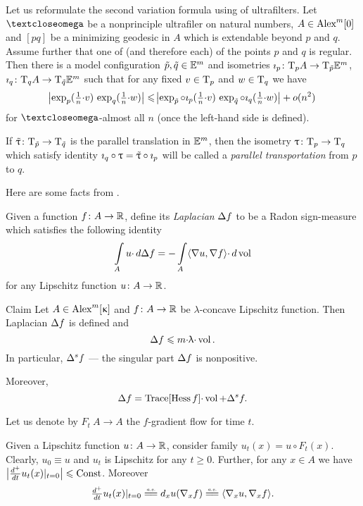 \documentclass[oneside,a4paper]{article}
\begin{document}
Let us reformulate the second variation formula \cite[1.1B]{petrunin:parallel}
using of ultrafilters.
Let $\o$ be a nonprinciple ultrafiler on natural numbers,
$A\in\CBB{m}{0}$
and $[p q]$ be a minimizing geodesic in $A$ which is extendable beyond $p$ and $q$.
Assume further that one of (and therefore each) of the  points $p$ and $q$ is regular.
Then there is a model configuration $\~p,\~q\in\EE^m$ and isometries $\imath_p\:\T_p A\to\T_{\~p}\EE^m$,
$\imath_q\:\T_q A\to\T_{\~q}\EE^m$ 
such that for any fixed $v\in\T_p$ and $w\in\T_q$ we have
$$
\l|\exp_p(\tfrac 1 n{\cdot} v)\,\exp_q(\tfrac 1 n{\cdot} w)\r|
\le
\l|\exp_{\~p}\circ\imath_p(\tfrac 1 n{\cdot} v)\,\exp_{\~q}\circ\imath_q(\tfrac1 n{\cdot} w)\r|+o(n^2)$$
for $\o$-almost all $n$ (once the left-hand  side is defined).

{\sloppy If $\~\tau\:\T_{\~p}\to\T_{\~q}$ is the parallel translation in $\EE^m$, then the isometry  \hbox{$\tau\:\T_p\to\T_q$} which satisfy identity $\imath_q\circ\tau=\~\tau\circ\imath_p$ will be called a  \emph{parallel transportation} from $p$ to $q$.

}
Here are some facts from \cite{petrunin:HarmFun}.

Given a function $f\:A\to\RR$, define its \emph{Laplacian} $\Lap f$ to be a Radon sign-measure which satisfies the following identity
$$\int\limits_Au{\cdot}\,d\Lap f
=
-\int\limits_A\<\nabla u,\nabla f\>{\cdot}\,d\vol$$
for any Lipschitz function $u\:A\to\RR$.

\begin{thm}{Claim}\label{lap}
Let $A\in\CBB{m}{\kappa}$ and $f\:A\to \RR$ be $\lambda$-concave Lipschitz function.
Then Laplacian $\Lap f$ is defined and
$$\Lap f\le m{\cdot}\lambda{\cdot}\vol.$$
In particular, $\Lap^s f$ --- the singular part $\Lap f$ is nonpositive.

Moreover, 
$$\Lap f =\Trace[\Hess f]{\cdot}\vol+\Lap^s f.$$

\end{thm}

Let us denote by $F_t\:A\to A$ the $f$-gradient flow for time $t$.

Given a Lipschitz function $u\:A\to\RR$, 
consider family $u_t(x)=u\circ F_t(x)$.
Clearly, $u_0\equiv u$ and $u_t$ is Lipschitz for any $t\ge0$.
Further, for any $x\in A$ we have $\bigl|{\tfrac{d^+}{d t}}u_t(x)|_{t=0}\bigr|\le\Const$.
Moreover 
$$\tfrac{d^+}{d t}u_t(x)|_{t=0}\ae d_x u(\nabla_x f)\ae\<\nabla_x u,\nabla_x f\>.$$
\end{document}
